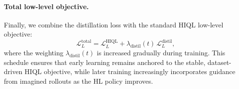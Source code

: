 \paragraph{Total low-level objective.}
Finally, we combine the distillation loss with the standard HIQL
low-level objective:
\begin{equation}
\mathcal{L}_L^\text{total}
= \mathcal{L}_L^\text{HIQL}
+ \lambda_\text{distil}(t)\,\mathcal{L}_L^\text{distil},
\end{equation}
where the weighting $\lambda_\text{distil}(t)$ is increased gradually
during training. This schedule ensures that early learning remains
anchored to the stable, dataset-driven HIQL objective, while later
training increasingly incorporates guidance from imagined rollouts as
the HL policy improves.




